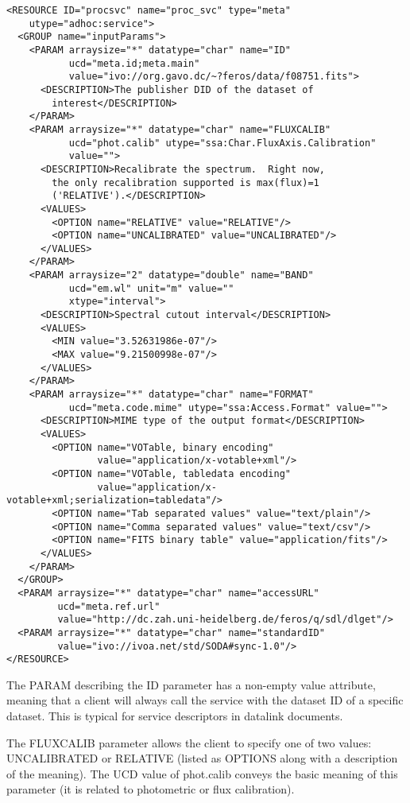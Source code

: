 \documentclass[11pt,a4paper]{ivoa}
\begin{document}
{\small
\begin{verbatim}
<RESOURCE ID="procsvc" name="proc_svc" type="meta" 
    utype="adhoc:service">
  <GROUP name="inputParams">
    <PARAM arraysize="*" datatype="char" name="ID" 
           ucd="meta.id;meta.main" 
           value="ivo://org.gavo.dc/~?feros/data/f08751.fits">
      <DESCRIPTION>The publisher DID of the dataset of 
        interest</DESCRIPTION>
    </PARAM>
    <PARAM arraysize="*" datatype="char" name="FLUXCALIB" 
           ucd="phot.calib" utype="ssa:Char.FluxAxis.Calibration" 
           value="">
      <DESCRIPTION>Recalibrate the spectrum.  Right now, 
        the only recalibration supported is max(flux)=1 
        ('RELATIVE').</DESCRIPTION>
      <VALUES>
        <OPTION name="RELATIVE" value="RELATIVE"/>
        <OPTION name="UNCALIBRATED" value="UNCALIBRATED"/>
      </VALUES>
    </PARAM>
    <PARAM arraysize="2" datatype="double" name="BAND" 
           ucd="em.wl" unit="m" value="" 
           xtype="interval">
      <DESCRIPTION>Spectral cutout interval</DESCRIPTION>
      <VALUES>
        <MIN value="3.52631986e-07"/>
        <MAX value="9.21500998e-07"/>
      </VALUES>
    </PARAM>
    <PARAM arraysize="*" datatype="char" name="FORMAT" 
           ucd="meta.code.mime" utype="ssa:Access.Format" value="">
      <DESCRIPTION>MIME type of the output format</DESCRIPTION>
      <VALUES>
        <OPTION name="VOTable, binary encoding" 
                value="application/x-votable+xml"/>
        <OPTION name="VOTable, tabledata encoding" 
                value="application/x-votable+xml;serialization=tabledata"/>
        <OPTION name="Tab separated values" value="text/plain"/>
        <OPTION name="Comma separated values" value="text/csv"/>
        <OPTION name="FITS binary table" value="application/fits"/>
      </VALUES>
    </PARAM>
  </GROUP>
  <PARAM arraysize="*" datatype="char" name="accessURL" 
         ucd="meta.ref.url" 
         value="http://dc.zah.uni-heidelberg.de/feros/q/sdl/dlget"/>
  <PARAM arraysize="*" datatype="char" name="standardID" 
         value="ivo://ivoa.net/std/SODA#sync-1.0"/>
</RESOURCE>
\end{verbatim}
}

The PARAM describing the ID parameter has a non-empty value attribute,
meaning that a client will always call the service with the dataset ID
of a specific dataset.  This is typical for service descriptors in
datalink documents.

The FLUXCALIB parameter allows the client to specify one of two values:
UNCALIBRATED or RELATIVE (listed as OPTIONS along with a description of
the meaning). The UCD \citep{2005ivoa.spec.0819D} value
of phot.calib conveys the basic meaning
of this parameter (it is related to photometric or flux calibration).
\end{document}
